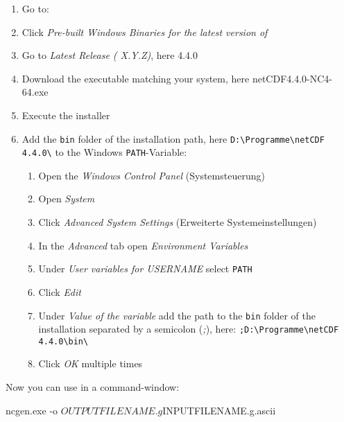 \begin{enumerate}[noitemsep]
 \item Go to: \href{\netcdfaddress}{\netcdfaddress}
 \item Click \textit{Pre-built Windows Binaries for the latest version of \netcdfname}
 \item Go to \textit{Latest Release (\netcdfname{} X.Y.Z)}, here \netcdfname{} 4.4.0
 \item Download the executable matching your system, here netCDF4.4.0-NC4-64.exe
 \item Execute the installer
 \item Add the \verb+bin+ folder of the installation path, here \verb+D:\Programme\netCDF 4.4.0\+ to the Windows \verb+PATH+-Variable:
 \begin{enumerate}
  \item Open the \textit{Windows Control Panel} (Systemsteuerung)
  \item Open \textit{System}
  \item Click \textit{Advanced System Settings} (Erweiterte Systemeinstellungen)
  \item In the \textit{Advanced} tab open \textit{Environment Variables}
  \item Under \textit{User variables for USERNAME} select \verb+PATH+
  \item Click \textit{Edit}
  \item Under \textit{Value of the variable} add the path to the \verb+bin+ folder of the \marktool{\netcdfname} installation separated by a semicolon (\textit{;}), here: \verb+;D:\Programme\netCDF 4.4.0\bin\+
  \item Click \textit{OK} multiple times
 \end{enumerate}
\end{enumerate}

Now you can use \marktool{\ncgenname} in a command-window:

\begin{code}
ncgen.exe -o $OUTPUTFILENAME.g $INPUTFILENAME.g.ascii
\end{code}


